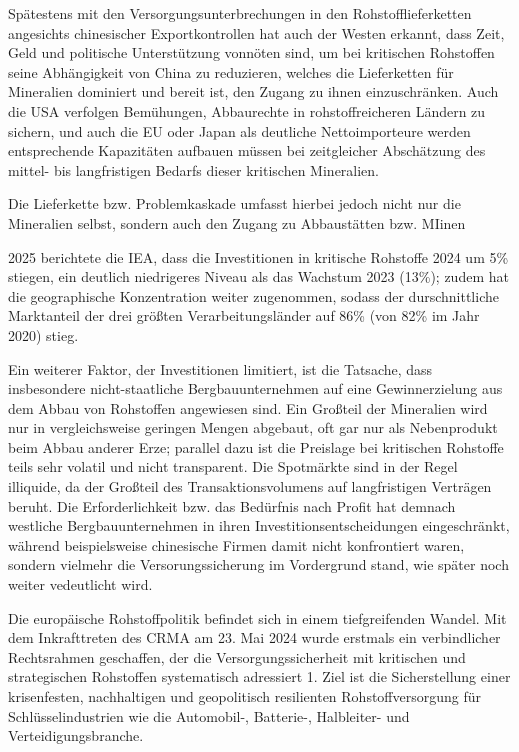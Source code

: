 \documentclass[12pt,a4paper,oneside]{book} %
\begin{document}
	Spätestens mit den Versorgungsunterbrechungen in den Rohstofflieferketten angesichts chinesischer Exportkontrollen hat auch der Westen erkannt, dass Zeit, Geld und politische Unterstützung vonnöten sind, um bei kritischen Rohstoffen seine Abhängigkeit von China zu reduzieren, welches die Lieferketten für Mineralien dominiert und bereit ist, den Zugang zu ihnen einzuschränken. Auch die USA verfolgen Bemühungen, Abbaurechte in rohstoffreicheren Ländern zu sichern, und auch die EU oder Japan als deutliche Nettoimporteure werden entsprechende Kapazitäten aufbauen müssen bei zeitgleicher Abschätzung des mittel- bis langfristigen Bedarfs dieser kritischen Mineralien.
	
	Die Lieferkette bzw. Problemkaskade umfasst hierbei jedoch nicht nur die Mineralien selbst, sondern auch den Zugang zu Abbaustätten bzw. MIinen
	
	2025 berichtete die IEA, dass die Investitionen in kritische Rohstoffe 2024 um 5\% stiegen, ein deutlich niedrigeres Niveau als das Wachstum 2023 (13\%); zudem hat die geographische Konzentration weiter zugenommen, sodass der durschnittliche Marktanteil der drei größten Verarbeitungsländer auf 86\% (von 82\% im Jahr 2020) stieg.\autocite{IEA Critical Minerals Outlook 2025, S. 68}
	
	Ein weiterer Faktor, der Investitionen limitiert, ist die Tatsache, dass insbesondere nicht-staatliche Bergbauunternehmen auf eine Gewinnerzielung aus dem Abbau von Rohstoffen angewiesen sind. Ein Großteil der Mineralien wird nur in vergleichsweise geringen Mengen abgebaut, oft gar nur als Nebenprodukt beim Abbau anderer Erze; parallel dazu ist die Preislage bei kritischen Rohstoffe teils sehr volatil und nicht transparent. Die Spotmärkte sind in der Regel illiquide, da der Großteil des Transaktionsvolumens auf langfristigen Verträgen beruht. Die Erforderlichkeit bzw. das Bedürfnis nach Profit hat demnach westliche Bergbauunternehmen in ihren Investitionsentscheidungen eingeschränkt, während beispielsweise chinesische Firmen damit nicht konfrontiert waren, sondern vielmehr die Versorungssicherung im Vordergrund stand, wie später noch weiter vedeutlicht wird.
	
	Die europäische Rohstoffpolitik befindet sich in einem tiefgreifenden Wandel. Mit dem Inkrafttreten des CRMA am 23. Mai 2024 wurde erstmals ein verbindlicher Rechtsrahmen geschaffen, der die Versorgungssicherheit mit kritischen und strategischen Rohstoffen systematisch adressiert 1. Ziel ist die Sicherstellung einer krisenfesten, nachhaltigen und geopolitisch resilienten Rohstoffversorgung für Schlüsselindustrien wie die Automobil-, Batterie-, Halbleiter- und Verteidigungsbranche.
	
\end{document}
